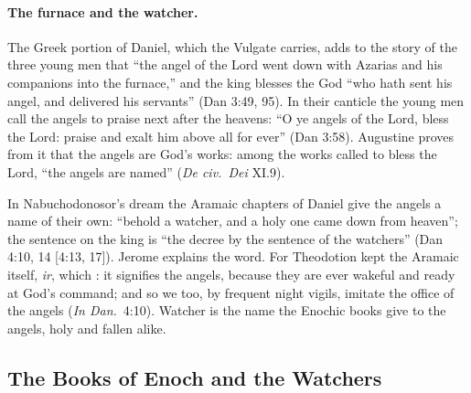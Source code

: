 \paragraph{The furnace and the watcher.} The Greek portion of Daniel, which
the Vulgate carries, adds to the story of the three young men that ``the
angel of the Lord went down with Azarias and his companions into the
furnace,'' and the king blesses the God ``who hath sent his angel, and
delivered his servants'' (Dan 3:49, 95). In their canticle the young men
call the angels to praise next after the heavens: ``O ye angels of the
Lord, bless the Lord: praise and exalt him above all for ever'' (Dan 3:58).
Augustine proves from it that the angels are God's works: among the works
called to bless the Lord, ``the angels are named'' (\emph{De civ.\ Dei}
XI.9).

In Nabuchodonosor's dream the Aramaic chapters of Daniel give the angels a
name of their own: ``behold a watcher, and a holy one came down from
heaven''; the sentence on the king is ``the decree by the sentence of the
watchers'' (Dan 4:10, 14 [4:13, 17]). Jerome explains the word. For  Theodotion kept the
Aramaic itself, \emph{ir}, which : it signifies the angels,
because they are ever wakeful and ready at God's command; and so we too, by
frequent night vigils, imitate the office of the angels (\emph{In Dan.}\
4:10). Watcher is the name the Enochic books give to the angels, holy and
fallen alike.

\sectionguard
\subsection{The Books of Enoch and the Watchers}\label{sec:bc-enoch}

